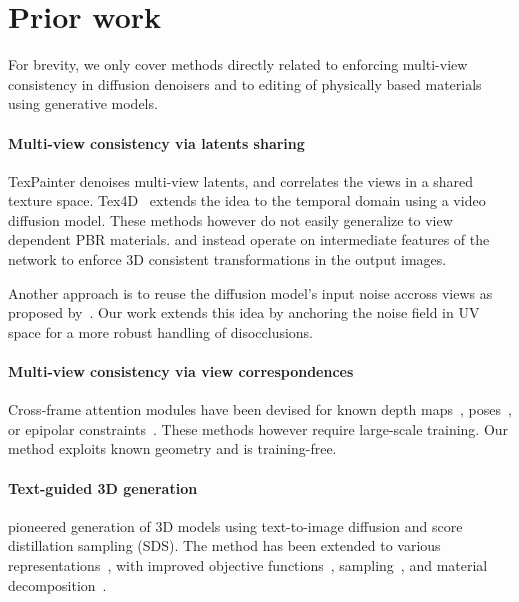 \section{Prior work}
\label{sec:prior}



For brevity, we only cover methods directly related to enforcing multi-view consistency in diffusion denoisers and to editing of physically based materials using generative models.







\paragraph{Multi-view consistency via latents sharing}
TexPainter \cite{TexPainter} denoises multi-view latents, and correlates the views in a shared texture space.
Tex4D~\cite{bao2024tex4d} extends the idea to the temporal domain using a video diffusion model.
These methods however do not easily generalize to view dependent PBR materials.
\citet{spiderman} and \citet{diffusion_handles} instead operate on intermediate features of the network to enforce 3D consistent transformations in the output images.

Another approach is to reuse the diffusion model's input noise accross views as proposed by~\cite{chang2024how,daras2024warped}.
Our work extends this idea by anchoring the noise field in UV space for a more robust handling of disocclusions.


\paragraph{Multi-view consistency via view correspondences}
Cross-frame attention modules have been devised for known depth maps~\cite{mvdiffusion}, poses~\cite{cerkezi2023multiview}, or epipolar constraints~\cite{spad}.
These methods however require large-scale training.
Our method exploits known geometry and is training-free.

\paragraph{Text-guided 3D generation}
\citet{poole2023dreamfusion} pioneered generation of 3D models 
using text-to-image diffusion and score distillation sampling (SDS).
The method has been extended to various representations~\cite{lin2023magic3d, taoran2023gaussiandreamer}, 
with improved objective functions~\cite{wang2023prolificdreamer}, 
sampling~\cite{zhu2023hifa}, and material decomposition~\cite{chen2023fantasia3d,youwang2024paintit}.

